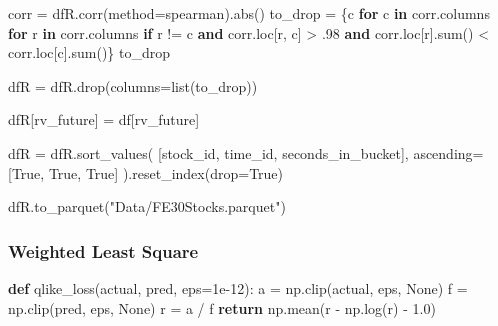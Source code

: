 \documentclass[
  letterpaper,
  DIV=11,
  numbers=noendperiod]{scrartcl}
\newenvironment{Shaded}{\begin{snugshade}}{\end{snugshade}}
\newcommand{\BuiltInTok}[1]{\textcolor[rgb]{0.00,0.23,0.31}{#1}}
\newcommand{\ControlFlowTok}[1]{\textcolor[rgb]{0.00,0.23,0.31}{\textbf{#1}}}
\newcommand{\FloatTok}[1]{\textcolor[rgb]{0.68,0.00,0.00}{#1}}
\newcommand{\KeywordTok}[1]{\textcolor[rgb]{0.00,0.23,0.31}{\textbf{#1}}}
\newcommand{\NormalTok}[1]{\textcolor[rgb]{0.00,0.23,0.31}{#1}}
\newcommand{\OperatorTok}[1]{\textcolor[rgb]{0.37,0.37,0.37}{#1}}
\newcommand{\StringTok}[1]{\textcolor[rgb]{0.13,0.47,0.30}{#1}}
\newcommand{\VariableTok}[1]{\textcolor[rgb]{0.07,0.07,0.07}{#1}}
\begin{document}
\begin{Shaded}
\begin{Highlighting}[]
\NormalTok{corr }\OperatorTok{=}\NormalTok{ dfR.corr(method}\OperatorTok{=}\StringTok{\textquotesingle{}spearman\textquotesingle{}}\NormalTok{).}\BuiltInTok{abs}\NormalTok{()}
\NormalTok{to\_drop }\OperatorTok{=}\NormalTok{ \{c }\ControlFlowTok{for}\NormalTok{ c }\KeywordTok{in}\NormalTok{ corr.columns }\ControlFlowTok{for}\NormalTok{ r }\KeywordTok{in}\NormalTok{ corr.columns}
\ControlFlowTok{if}\NormalTok{ r }\OperatorTok{!=}\NormalTok{ c }\KeywordTok{and}\NormalTok{ corr.loc[r, c] }\OperatorTok{\textgreater{}} \FloatTok{.98} \KeywordTok{and}\NormalTok{ corr.loc[r].}\BuiltInTok{sum}\NormalTok{() }\OperatorTok{\textless{}}\NormalTok{ corr.loc[c].}\BuiltInTok{sum}\NormalTok{()\}}
\NormalTok{to\_drop}
\end{Highlighting}
\end{Shaded}

\begin{Shaded}
\begin{Highlighting}[]
\NormalTok{dfR }\OperatorTok{=}\NormalTok{ dfR.drop(columns}\OperatorTok{=}\BuiltInTok{list}\NormalTok{(to\_drop))}

\NormalTok{dfR[}\StringTok{\textquotesingle{}rv\_future\textquotesingle{}}\NormalTok{] }\OperatorTok{=}\NormalTok{ df[}\StringTok{\textquotesingle{}rv\_future\textquotesingle{}}\NormalTok{]}

\NormalTok{dfR }\OperatorTok{=}\NormalTok{ dfR.sort\_values(}
\NormalTok{    [}\StringTok{\textquotesingle{}stock\_id\textquotesingle{}}\NormalTok{, }\StringTok{\textquotesingle{}time\_id\textquotesingle{}}\NormalTok{, }\StringTok{\textquotesingle{}seconds\_in\_bucket\textquotesingle{}}\NormalTok{],}
\NormalTok{    ascending}\OperatorTok{=}\NormalTok{[}\VariableTok{True}\NormalTok{, }\VariableTok{True}\NormalTok{, }\VariableTok{True}\NormalTok{]}
\NormalTok{).reset\_index(drop}\OperatorTok{=}\VariableTok{True}\NormalTok{)}

\NormalTok{dfR.to\_parquet(}\StringTok{"Data/FE30Stocks.parquet"}\NormalTok{)}
\end{Highlighting}
\end{Shaded}

\subsubsection{Weighted Least Square}\label{weighted-least-square}

\begin{Shaded}
\begin{Highlighting}[]
\KeywordTok{def}\NormalTok{ qlike\_loss(actual, pred, eps}\OperatorTok{=}\FloatTok{1e{-}12}\NormalTok{):}
\NormalTok{    a }\OperatorTok{=}\NormalTok{ np.clip(actual, eps, }\VariableTok{None}\NormalTok{)     }
\NormalTok{    f }\OperatorTok{=}\NormalTok{ np.clip(pred,   eps, }\VariableTok{None}\NormalTok{)}
\NormalTok{    r }\OperatorTok{=}\NormalTok{ a }\OperatorTok{/}\NormalTok{ f}
    \ControlFlowTok{return}\NormalTok{ np.mean(r }\OperatorTok{{-}}\NormalTok{ np.log(r) }\OperatorTok{{-}} \FloatTok{1.0}\NormalTok{) }
\end{Highlighting}
\end{Shaded}
\end{document}
